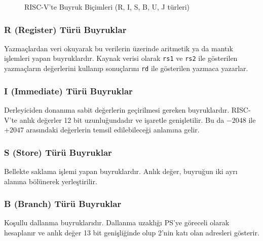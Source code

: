 \begin{figure}[H]
\caption{RISC-V'te Buyruk Biçimleri (R, I, S, B, U, J türleri)}
\label{fig:riscv-buyruk-bicimleri}
\end{figure}

\subsubsection*{R (Register) Türü Buyruklar} Yazmaçlardan veri okuyarak bu verilerin üzerinde aritmetik ya da mantık işlemleri yapan buyruklardır. Kaynak verisi olarak \texttt{rs1} ve \texttt{rs2} ile gösterilen yazmaçların değerlerini kullanıp sonuçlarını \texttt{rd} ile gösterilen yazmaca yazarlar.

\subsubsection*{I (Immediate) Türü Buyruklar} Derleyiciden donanıma sabit değerlerin geçirilmesi gereken buyruklardır. RISC-V'te anlık değerler 12 bit uzunluğundadır ve işaretle genişletilir. Bu da $-2048$ ile $+2047$ arasındaki değerlerin temsil edilebileceği anlamına gelir.

\subsubsection*{S (Store) Türü Buyruklar} Bellekte saklama işlemi yapan buyruklardır. Anlık değer, buyruğun iki ayrı alanına bölünerek yerleştirilir.

\subsubsection*{B (Branch) Türü Buyruklar} Koşullu dallanma buyruklarıdır. Dallanma uzaklığı PS'ye göreceli olarak hesaplanır ve anlık değer 13 bit genişliğinde olup 2'nin katı olan adresleri gösterir.


